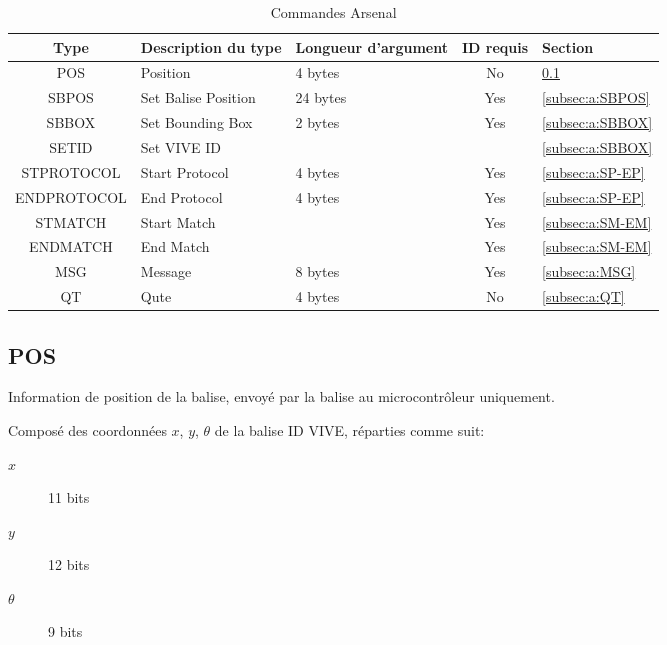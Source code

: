 \begin{table}[htb]
	\centering
	\begin{tabular}{|c|l|l|c|l|}
		\hline
		Type        & Description du type & Longueur d'argument & ID requis & Section            \\
		\hline
		POS         & Position            & 4 bytes             & No        & \ref{subsec:a:POS}   \\
		\hline
		SBPOS       & Set Balise Position & 24 bytes            & Yes       & \ref{subsec:a:SBPOS} \\
		SBBOX       & Set Bounding Box    & 2 bytes             & Yes       & \ref{subsec:a:SBBOX} \\
		SETID       & Set VIVE ID         &                     &           & \ref{subsec:a:SBBOX} \\
		\hline
		STPROTOCOL  & Start Protocol      & 4 bytes             & Yes       & \ref{subsec:a:SP-EP} \\
		ENDPROTOCOL & End Protocol        & 4 bytes             & Yes       & \ref{subsec:a:SP-EP} \\
		\hline
		STMATCH     & Start Match         &                     & Yes       & \ref{subsec:a:SM-EM} \\
		ENDMATCH    & End Match           &                     & Yes       & \ref{subsec:a:SM-EM} \\
		\hline
		MSG         & Message             & 8 bytes             & Yes       & \ref{subsec:a:MSG}   \\
		\hline
		QT          & Qute                & 4 bytes             & No        & \ref{subsec:a:QT}    \\
		\hline
	\end{tabular}
	\caption{Commandes Arsenal}
	\label{fig:commandes-arsenal}
\end{table}


\subsection{POS}
	\label{subsec:a:POS}

	Information de position de la balise, envoyé par la balise au microcontrôleur uniquement.

	Composé des coordonnées $x$, $y$, $\theta$ de la balise ID VIVE, réparties comme suit:

	\begin{description}
		\item[$x$] 11 bits
		\item[$y$] 12 bits
		\item[$\theta$] 9 bits
	\end{description}

